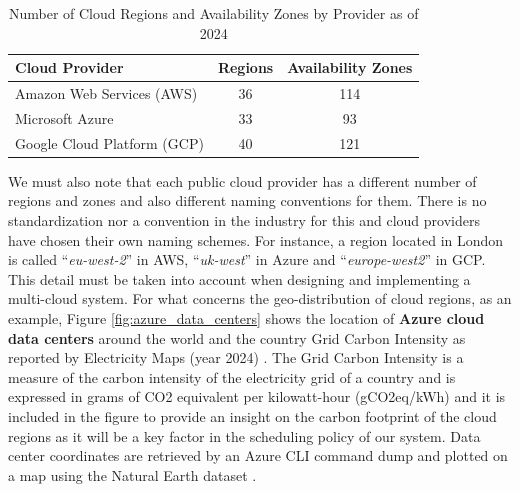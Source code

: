 \begin{table}[t]
    \centering
    \begin{tabular}{|l|c|c|}
    \hline
    \textbf{Cloud Provider} & \textbf{Regions} & \textbf{Availability Zones} \\
    \hline
    Amazon Web Services (AWS) & 36 & 114 \\
    \hline
    Microsoft Azure & 33 & 93 \\
    \hline
    Google Cloud Platform (GCP) & 40 & 121 \\
    \hline
    \end{tabular}
    \caption{Number of Cloud Regions and Availability Zones by Provider as of 2024 \cite{statista_cloud_regions}}
    \label{tab:cloud_regions_azs}
\end{table}

We must also note that each public cloud provider has a different number of regions and zones and also different naming conventions for them.
There is no standardization nor a convention in the industry for this and cloud providers have chosen their own naming schemes.
For instance, a region located in London is called ``\textit{eu-west-2}'' in AWS, ``\textit{uk-west}'' in Azure and ``\textit{europe-west2}'' in GCP.
This detail must be taken into account when designing and implementing a multi-cloud system.
For what concerns the geo-distribution of cloud regions, as an example, Figure \ref{fig:azure_data_centers} shows the location of \textbf{Azure cloud data centers} around the world and the country Grid Carbon Intensity as reported by Electricity Maps (year 2024) \cite{electricity_maps}.
The Grid Carbon Intensity is a measure of the carbon intensity of the electricity grid of a country and is expressed in grams of CO2 equivalent per kilowatt-hour (gCO2eq/kWh) and it is included in the figure to provide an insight on the carbon footprint of the cloud regions as it will be a key factor in the scheduling policy of our system.
Data center coordinates are retrieved by an Azure CLI command dump \cite{azure_data_centers_information} and plotted on a map using the Natural Earth dataset \cite{naturalearthdata}.

